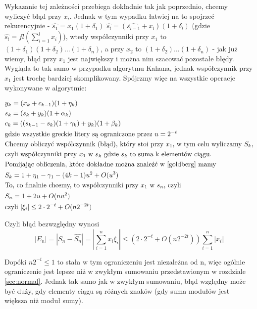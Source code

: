 \documentclass[11pt]{article}
\begin{document}
Wykazanie tej zależności przebiega dokładnie tak jak poprzednio, chcemy wyliczyć błąd przy $x_i$. Jednak w tym wypadku łatwiej na to spojrzeć rekurencyjnie - $\hat{s_1} = x_1(1 + \delta_1)$ $\hat{s_l} = (\hat{s_{l-1}} + x_l)(1 + \delta_l)$ (gdzie $\hat{s_l} = fl(\sum_{i=1}^{l} x_i)$), wtedy współczynniki przy $x_1$ to $(1 + \delta_1)(1 + \delta_2)\dots(1 + \delta_n)$, a przy $x_2$ to $(1 + \delta_2)\dots(1 + \delta_n)$ - jak już wiemy, błąd przy $x_1$ jest największy i można nim szacować pozostałe błędy. Wygląda to tak samo w przypadku algorytmu Kahana, jednak współczynnik przy $x_1$ jest trochę bardziej skomplikowany. Spójrzmy więc na wszystkie operacje wykonywane w algorytmie:

\begin{equation}
\begin{split}
	&y_k = (x_{k} + c_{k-1})(1 + \eta_{k})\\
	&s_k = (s_k + y_k)(1 + \alpha_k) \\
	&c_k = ((s_{k-1} - s_{k})(1 + \gamma_k) + y_k)(1 + \beta_k)\\
	&\text{gdzie wszystkie greckie litery są ograniczone przez } u = 2^{-t}\\
	&\text{Chcemy obliczyć wspólczynnik (błąd), który stoi przy $x_1$, w tym celu wyliczamy $S_k$,} \\ 
	&\text{czyli współczynniki przy $x_1$ w $s_k$ gdzie $s_k$ to suma k elementów ciągu.}\\
	&\text{Pomijając obliczenia, które dokładne można znaleźć w \cite{goldberg} mamy}\\
	&S_k = 1 + \eta_1 - \gamma_1 - (4k + 1)u^2 + O(u^3) \\
	&\text{To, co finalnie chcemy, to współczynniki przy $x_1$ w $s_n$, czyli} \\
	&S_n = 1 + 2u + O(nu^2) \\
	&\text{czyli } |\xi_i| \leq 2 \cdot 2^{-t} + O(n2^{-2t})
\end{split}
\end{equation}

Czyli błąd bezwzględny wynosi
\begin{equation}
|E_n| = |S_n - \hat{S_n}| = |\sum_{i=1}^{n}x_i \xi_i| \leq (2 \cdot 2^{-t} + O(n2^{-2t})) \sum_{i=1}^{n}|x_i|
\end{equation}

Dopóki $n2^{-t} \leq 1$ to stała w tym ograniczeniu jest niezależna od n, więc ogólnie ograniczenie jest lepsze niż w zwykłym sumowaniu przedstawionym w rozdziale \ref{sec:normal}. Jednak tak samo jak w zwykłym sumowaniu, błąd względny może być duży, gdy elementy ciągu są różnych znaków (gdy suma modułów jest większa niż moduł sumy).
\end{document}
